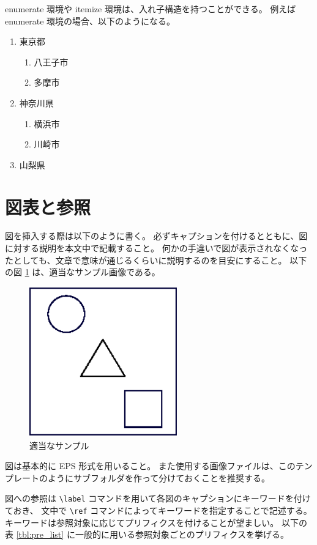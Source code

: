 enumerate 環境や itemize 環境は、入れ子構造を持つことができる。
例えば enumerate 環境の場合、以下のようになる。
\begin{enumerate}
 \item 東京都
 \begin{enumerate}
  \item 八王子市
  \item 多摩市
 \end{enumerate}
 \item 神奈川県
 \begin{enumerate}
  \item 横浜市
  \item 川崎市
 \end{enumerate}
 \item 山梨県
\end{enumerate}

\section{図表と参照}
\label{sec:fig_tbl}

図を挿入する際は以下のように書く。
必ずキャプションを付けるとともに、図に対する説明を本文中で記載すること。
何かの手違いで図が表示されなくなったとしても、文章で意味が通じるくらいに説明するのを目安にすること。
以下の図 \ref{fig:sample} は、適当なサンプル画像である。

\begin{figure}[H]
  \centering
  \includegraphics[width=6.4cm]{./fig/fig-sample.eps}
  \caption{適当なサンプル}
  \label{fig:sample}
\end{figure}

図は基本的に EPS 形式を用いること。
また使用する画像ファイルは、このテンプレートのようにサブフォルダを作って分けておくことを推奨する。

図への参照は \verb+\label+ コマンドを用いて各図のキャプションにキーワードを付けておき、
文中で \verb+\ref+ コマンドによってキーワードを指定することで記述する。
キーワードは参照対象に応じてプリフィクスを付けることが望ましい。
以下の表 \ref{tbl:pre_list} に一般的に用いる参照対象ごとのプリフィクスを挙げる。

